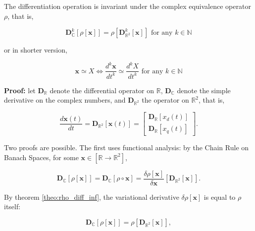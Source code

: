 \begin{theorem} \label{corollary:invariance_differentiation} %
	The differentiation operation is invariant under the complex equivalence operator $\rho$, that is,

\begin{equation} \mathbf{D}^k_\mathbb{C}\left[\rho\left[\mathbf{x}\right]\right] = \rho\left[\mathbf{D}^k_{\mathbb{R}^2}\left[\mathbf{x}\right]\right]  \text{ for any } k\in\mathbb{N} \end{equation}

	\noindent or in shorter version,

\begin{equation} \mathbf{x} \simeq X \Leftrightarrow \dfrac{d^k\mathbf{x}}{dt^k} \simeq \dfrac{d^k X}{dt^k} \text{ for any } k\in\mathbb{N}\end{equation}
\end{theorem}
\textbf{Proof:} let $\mathbf{D}_{\mathbb{R}}$ denote the differential operator on $\mathbb{R}$, $\mathbf{D}_{\mathbb{C}}$ denote the simple derivative on the complex numbers, and $\mathbf{D}_{\mathbb{R}^2}$ the operator on $\mathbb{R}^2$, that is,

\begin{equation} \dfrac{d\mathbf{x}(t)}{dt} = \mathbf{D}_{\mathbb{R}^2}\left[\mathbf{x}\left(t\right)\right] = \left[\begin{array}{c} \mathbf{D}_{\mathbb{R}}\left[x_d(t)\right] \\[5mm] \mathbf{D}_{\mathbb{R}}\left[x_q(t)\right] \end{array}\right]. \end{equation}

	Two proofs are possible. The first uses functional analysis: by the Chain Rule on Banach Spaces, for some $\mathbf{x}\in\left[\mathbb{R}\to\mathbb{R}^2\right]$,

\begin{equation} \mathbf{D}_\mathbb{C}\left[\rho\left[\mathbf{x}\right]\right] = \mathbf{D}_\mathbb{C}\left[\rho \circ \mathbf{x}\right] = \dfrac{\delta \rho\left[\mathbf{x}\right]}{\delta \mathbf{x}}\left[\mathbf{D}_{\mathbb{R}^2}\left[\mathbf{x}\right]\right]. \end{equation}

	By theorem \ref{theo:rho_diff_inf}, the variational derivative $\delta\rho\left[\mathbf{x}\right]$ is equal to $\rho$ itself:

\begin{equation} \mathbf{D}_\mathbb{C}\left[\rho\left[\mathbf{x}\right]\right] = \rho\left[\mathbf{D}_{\mathbb{R}^2}\left[\mathbf{x}\right]\right], \end{equation}

